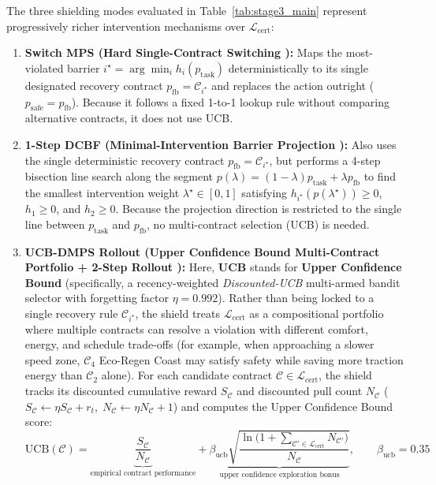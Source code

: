 \documentclass[10pt,a4paper]{article}
\begin{document}
The three shielding modes evaluated in Table~\ref{tab:stage3_main} represent progressively richer intervention mechanisms over $\mathcal{L}_{\text{cert}}$:
\begin{enumerate}
    \item \textbf{Switch MPS (Hard Single-Contract Switching \cite{banerjee2024,goodall2026}):} Maps the most-violated barrier $i^\star = \arg\min_i h_i(p_{\text{task}})$ deterministically to its single designated recovery contract $p_{\text{fb}} = \mathcal{C}_{i^\star}$ and replaces the action outright ($p_{\text{safe}} = p_{\text{fb}}$). Because it follows a fixed 1-to-1 lookup rule without comparing alternative contracts, it does not use UCB.
    \item \textbf{1-Step DCBF (Minimal-Intervention Barrier Projection \cite{hsu2024,wang2023}):} Also uses the single deterministic recovery contract $p_{\text{fb}} = \mathcal{C}_{i^\star}$, but performs a 4-step bisection line search along the segment $p(\lambda) = (1 - \lambda)p_{\text{task}} + \lambda p_{\text{fb}}$ to find the smallest intervention weight $\lambda^\star \in [0, 1]$ satisfying $h_{i^\star}(p(\lambda^\star)) \ge 0$, $h_1 \ge 0$, and $h_2 \ge 0$. Because the projection direction is restricted to the single line between $p_{\text{task}}$ and $p_{\text{fb}}$, no multi-contract selection (UCB) is needed.
    \item \textbf{UCB-DMPS Rollout (Upper Confidence Bound Multi-Contract Portfolio + 2-Step Rollout \cite{adalat2026a,banerjee2024}):} Here, \textbf{UCB} stands for \textbf{Upper Confidence Bound} (specifically, a recency-weighted \textit{Discounted-UCB} multi-armed bandit selector with forgetting factor $\eta = 0.992$). Rather than being locked to a single recovery rule $\mathcal{C}_{i^\star}$, the shield treats $\mathcal{L}_{\text{cert}}$ as a compositional portfolio where multiple contracts can resolve a violation with different comfort, energy, and schedule trade-offs (for example, when approaching a slower speed zone, $\mathcal{C}_4$ Eco-Regen Coast may satisfy safety while saving more traction energy than $\mathcal{C}_2$ alone). For each candidate contract $\mathcal{C} \in \mathcal{L}_{\text{cert}}$, the shield tracks its discounted cumulative reward $S_{\mathcal{C}}$ and discounted pull count $N_{\mathcal{C}}$ ($S_{\mathcal{C}} \leftarrow \eta S_{\mathcal{C}} + r_t,\; N_{\mathcal{C}} \leftarrow \eta N_{\mathcal{C}} + 1$) and computes the Upper Confidence Bound score:
    \begin{equation}
        \text{UCB}(\mathcal{C}) = \underbrace{\frac{S_{\mathcal{C}}}{N_{\mathcal{C}}}}_{\text{empirical contract performance}} + \underbrace{\beta_{\text{ucb}}\sqrt{\frac{\ln\!\big(1 + \sum_{\mathcal{C}' \in \mathcal{L}_{\text{cert}}} N_{\mathcal{C}'}\big)}{N_{\mathcal{C}}}}}_{\text{upper confidence exploration bonus}}, \qquad \beta_{\text{ucb}} = 0.35

\end{equation}
\end{enumerate}
\end{document}
